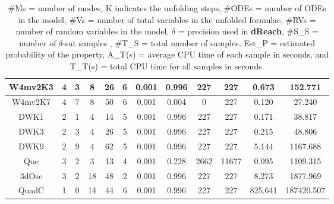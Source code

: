 \begin{table}[h!]
\begin{tabular}{c|c|c|c|c|c|c|c|c|c|c|c}
    W4mv2K3       & 4       & 3 & 8      & 26     & 6     & 0.001 & 0.996      & 227         & 227        & 0.673   & 152.771      \\ \hline
    W4mv2K7       & 4       & 7 & 8      & 50     & 6     & 0.001 & 0.004     & 0         & 227        & 0.120    & 27.240          \\ \hline
    DWK1      & 2       & 1 & 4      & 14    & 5     & 0.001 & 0.996  & 227       & 227      & 0.171   & 38.817      \\ \hline
    DWK3      & 2       & 3 & 4      & 26    & 5     & 0.001 & 0.996  & 227       & 227      & 0.215    & 48.806      \\ \hline
    DWK9      & 2       & 9 & 4      & 62    & 5     & 0.001 & 0.996  & 227       & 227      & 5.144   &  1167.688      \\ \hline
    Que       & 3       & 2 & 3      & 13     & 4     & 0.001 & 0.228      & 2662         & 11677        & 0.095   & 1109.315   \\ \hline
    3dOsc     & 3       & 2 & 18      & 48     & 2     & 0.001 & 0.996      & 227         & 227        & 8.273  & 1877.969   \\ \hline
    QuadC     & 1       & 0 & 14      & 44     & 6     & 0.001 & 0.996      & 227         & 227        & 825.641 & 187420.507   \\ \hline
    \end{tabular}
    \caption {\#Ms = number of modes, K indicates the unfolding steps, \#ODEs = number of ODEs in the model, \#Vs = number of total variables in the unfolded formulae, \#RVs = number of random variables in the model, $\delta$ = precision used in 
{\bf dReach}, \#S\_S = number of $\delta$-sat samples , \#T\_S = total number of samples, Est\_P = estimated 
probability of the property,  A\_T(s) = average CPU time of each sample in seconds, and T\_T(s) = total CPU time for all samples in seconds.}
    \label{table:exp}
\end{table}
\vspace{-1.1cm}

